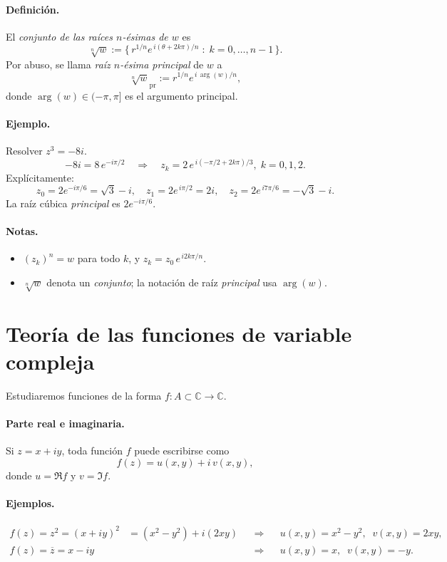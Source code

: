 \documentclass[a4paper,12pt]{article}
\begin{document}
\paragraph{Definición.}
El \emph{conjunto de las raíces \(n\)-ésimas de \(w\)} es
\[
\sqrt[n]{w}:=\bigl\{\,r^{1/n}e^{\,i(\theta+2k\pi)/n}\;:\;k=0,\dots,n-1\,\bigr\}.
\]
Por abuso, se llama \emph{raíz \(n\)-ésima principal} de \(w\) a
\[
\sqrt[n]{w}_{\mathrm{pr}}:=r^{1/n}e^{\,i\,\arg(w)/n},
\]
donde \(\arg(w)\in(-\pi,\pi]\) es el argumento principal.

\paragraph{Ejemplo.} Resolver \(z^3=-8i\).
\[
-8i=8\,e^{-i\pi/2}\quad\Rightarrow\quad
z_k=2\,e^{\,i(-\pi/2+2k\pi)/3},\;k=0,1,2.
\]
Explícitamente:
\[
z_0=2e^{-i\pi/6}=\sqrt{3}-i,\quad
z_1=2e^{\,i\pi/2}=2i,\quad
z_2=2e^{\,i7\pi/6}=-\sqrt{3}-i.
\]
La raíz cúbica \emph{principal} es \(2e^{-i\pi/6}\).

\paragraph{Notas.}
\begin{itemize}[leftmargin=1.2em]
  \item \((z_k)^n=w\) para todo \(k\), y \(z_k=z_0\,e^{\,i2k\pi/n}\).
  \item \(\sqrt[n]{w}\) denota un \emph{conjunto}; la notación de raíz \emph{principal} usa \(\arg(w)\).
\end{itemize}

\newpage

\section{Teoría de las funciones de variable compleja}
Estudiaremos funciones de la forma \(f:A\subset\mathbb{C}\to\mathbb{C}\).

\paragraph{Parte real e imaginaria.}
Si \(z=x+iy\), toda función \(f\) puede escribirse como
\[
f(z)=u(x,y)+i\,v(x,y),
\]
donde \(u=\Re f\) y \(v=\Im f\).

\paragraph{Ejemplos.}
\begin{align*}
f(z)=z^2=(x+iy)^2 &= (x^2-y^2)+i(2xy)
&&\Rightarrow&& u(x,y)=x^2-y^2,\;\; v(x,y)=2xy,\\
f(z)=\overline{z}=x-iy &&&\Rightarrow&& u(x,y)=x,\;\; v(x,y)=-y.
\end{align*}
\end{document}
